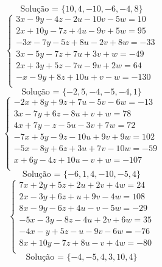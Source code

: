 \documentclass[12pt,oneside,a4paper]{article}
\begin{document}
\begin{equation*}
\text{Solução = }\{10,4,-10,-6,-4,8\}
\end{equation*}
\vspace{\baselineskip}
\begin{equation*}
\begin{cases}
3x-9y-4z-2u-10v-5w=10 \\
2x+10y-7z+4u-9v+5w=95 \\
-3x-7y-5z+8u-2v+8w=-33 \\
3x-5y-7z+7u+3v+w=-49 \\
2x+3y+5z-7u-9v+2w=64 \\
-x-9y+8z+10u+v-w=-130 \\
\end{cases}
\end{equation*}
\begin{equation*}
\text{Solução = }\{-2,5,-4,-5,-4,1\}
\end{equation*}
\vspace{\baselineskip}
\begin{equation*}
\begin{cases}
-2x+8y+9z+7u-5v-6w=-13 \\
3x-7y+6z-8u+v+w=78 \\
4x+7y-z-5u-3v+7w=72 \\
-7x+5y-9z-10u+9v+9w=102 \\
-5x-8y+6z+3u+7v-10w=-59 \\
x+6y-4z+10u-v+w=-107 \\
\end{cases}
\end{equation*}
\begin{equation*}
\text{Solução = }\{-6,1,4,-10,-5,4\}
\end{equation*}
\vspace{\baselineskip}
\begin{equation*}
\begin{cases}
7x+2y+5z+2u+2v+4w=24 \\
2x-3y+6z+u+9v-4w=108 \\
8x-9y-6z+4u-v-5w=-29 \\
-5x-3y-8z-4u+2v+6w=35 \\
-4x-y+5z-u-9v-6w=-76 \\
8x+10y-7z+8u-v+4w=-80 \\
\end{cases}
\end{equation*}
\begin{equation*}
\text{Solução = }\{-4,-5,4,3,10,4\}
\end{equation*}
\end{document}
